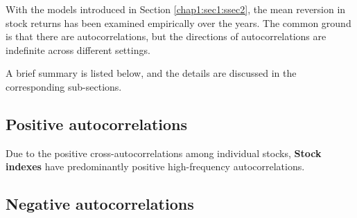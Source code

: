 With the models introduced in Section \ref{chap1:sec1:ssec2}, the mean reversion in stock returns
has been examined empirically over the years. The common ground is that there are autocorrelations,
but the directions of autocorrelations are indefinite across different settings.

A brief summary is listed below, and the details are discussed in the corresponding sub-sections.

\subsection{Positive autocorrelations}
Due to the positive cross-autocorrelations among individual stocks, \textbf{Stock indexes} have predominantly
positive high-frequency autocorrelations.

\subsection{Negative autocorrelations}

